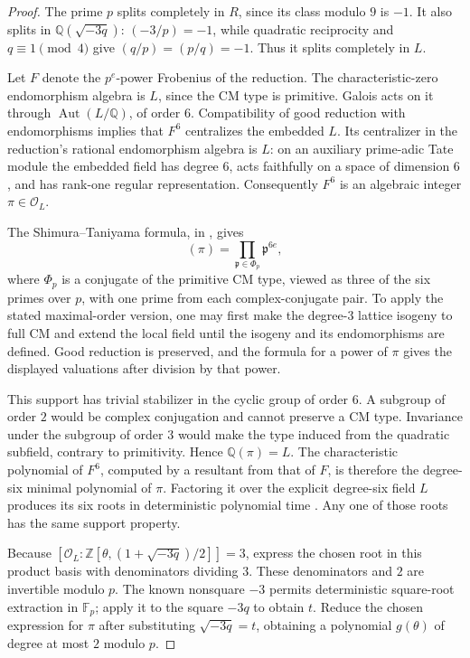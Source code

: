 \documentclass[11pt]{article}
\theoremstyle{definition}
\theoremstyle{remark}
\begin{document}
\begin{proof}
The prime \(p\) splits completely in \(R\), since its class modulo
\(9\) is \(-1\). It also splits in \(\mathbb Q(\sqrt{-3q})\):
\((-3/p)=-1\), while quadratic reciprocity and \(q\equiv1\pmod4\)
give \((q/p)=(p/q)=-1\). Thus it splits completely in \(L\).

Let \(F\) denote the \(p^e\)-power Frobenius of the reduction.
The characteristic-zero endomorphism algebra is \(L\), since the
CM type is primitive. Galois acts on it through
\(\operatorname{Aut}(L/\mathbb Q)\), of order \(6\). Compatibility
of good reduction with endomorphisms implies that \(F^6\) centralizes
the embedded \(L\). Its centralizer in the reduction's rational
endomorphism algebra is \(L\): on an auxiliary prime-adic Tate
module the embedded field has degree \(6\), acts faithfully on a
space of dimension \(6\), and has rank-one regular representation.
Consequently \(F^6\) is an algebraic integer \(\pi\in\mathcal O_L\).

The Shimura--Taniyama formula, in
\citet[Theorem~8.1 and Corollaries~8.2--8.3, pp.~66--68]{MilneCM2020},
gives
\[
 (\pi)=\prod_{\mathfrak p\in\Phi_p}\mathfrak p^{6e},
\]
where \(\Phi_p\) is a conjugate of the primitive CM type, viewed as
three of the six primes over \(p\), with one prime from each
complex-conjugate pair. To apply the stated maximal-order version,
one may first make the degree-\(3\) lattice isogeny to full CM and
extend the local field until the isogeny and its endomorphisms are
defined. Good reduction is preserved, and the formula for a power of
\(\pi\) gives the displayed valuations after division by that power.

This support has trivial stabilizer in the cyclic group of order
\(6\). A subgroup of order \(2\) would be complex conjugation and
cannot preserve a CM type. Invariance under the subgroup of order
\(3\) would make the type induced from the quadratic subfield,
contrary to primitivity. Hence \(\mathbb Q(\pi)=L\).
The characteristic polynomial of \(F^6\), computed by a resultant
from that of \(F\), is therefore the degree-six minimal polynomial
of \(\pi\). Factoring it over the explicit degree-six field \(L\)
produces its six roots in deterministic polynomial time
\citep[Theorem~4.5, pp.~253--254]{Lenstra1983}.
Any one of those roots has the same support property.

Because \([\mathcal O_L:\mathbb Z[\theta,(1+\sqrt{-3q})/2]]=3\),
express the chosen root in this product basis with denominators
dividing \(3\). These denominators and \(2\) are invertible modulo
\(p\). The known nonsquare \(-3\) permits deterministic square-root
extraction in \(\mathbb F_p\); apply it to the square \(-3q\) to
obtain \(t\). Reduce the chosen expression for \(\pi\) after
substituting \(\sqrt{-3q}=t\), obtaining a polynomial \(g(\theta)\)
of degree at most \(2\) modulo \(p\).


\end{proof}
\end{document}
